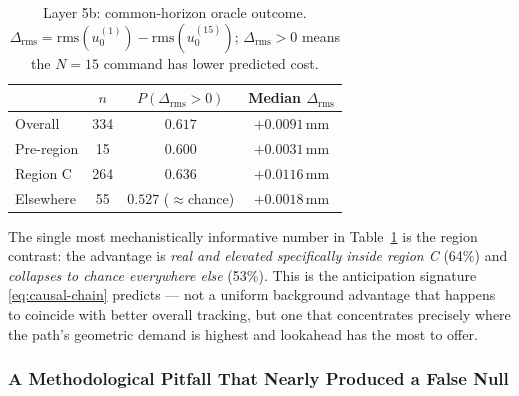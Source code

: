 \documentclass[11pt]{article}
\begin{document}
\begin{table}[h]
\centering
\caption{Layer 5b: common-horizon oracle outcome. $\Delta_{\mathrm{rms}} = \mathrm{rms}(u_0^{(1)}) - \mathrm{rms}(u_0^{(15)})$; $\Delta_{\mathrm{rms}}{>}0$ means the $N{=}15$ command has lower predicted cost.}
\label{tab:oracle}
\begin{tabular}{@{}lccc@{}}
\toprule
 & $n$ & $P(\Delta_{\mathrm{rms}}{>}0)$ & Median $\Delta_{\mathrm{rms}}$ \\
\midrule
Overall & 334 & $0.617$ & $+0.0091\,\mathrm{mm}$ \\
Pre-region & 15 & $0.600$ & $+0.0031\,\mathrm{mm}$ \\
Region C & 264 & $\mathbf{0.636}$ & $+0.0116\,\mathrm{mm}$ \\
Elsewhere & 55 & $\mathbf{0.527}$ ($\approx$chance) & $+0.0018\,\mathrm{mm}$ \\
\bottomrule
\end{tabular}
\end{table}

The single most mechanistically informative number in
Table~\ref{tab:oracle} is the region contrast: the advantage is
\emph{real and elevated specifically inside region C} (64\%) and
\emph{collapses to chance everywhere else} (53\%). This is the
anticipation signature \eqref{eq:causal-chain} predicts --- not a
uniform background advantage that happens to coincide with better
overall tracking, but one that concentrates precisely where the
path's geometric demand is highest and lookahead has the most to
offer.

\subsubsection{A Methodological Pitfall That Nearly Produced a False Null}
\label{sec:ph-oracle-bug}
\end{document}
